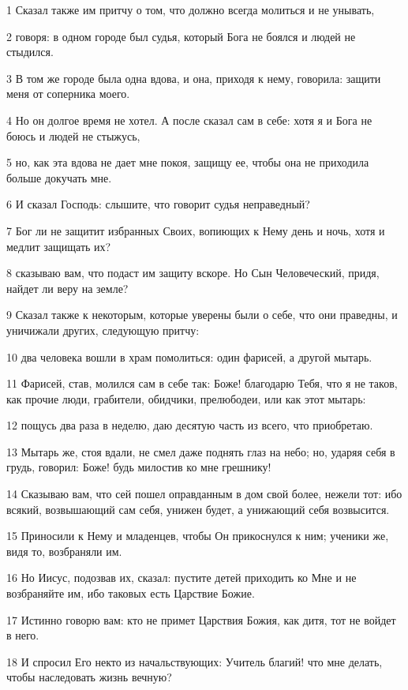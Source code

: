\par 1 Сказал также им притчу о том, что должно всегда молиться и не унывать,
\par 2 говоря: в одном городе был судья, который Бога не боялся и людей не стыдился.
\par 3 В том же городе была одна вдова, и она, приходя к нему, говорила: защити меня от соперника моего.
\par 4 Но он долгое время не хотел. А после сказал сам в себе: хотя я и Бога не боюсь и людей не стыжусь,
\par 5 но, как эта вдова не дает мне покоя, защищу ее, чтобы она не приходила больше докучать мне.
\par 6 И сказал Господь: слышите, что говорит судья неправедный?
\par 7 Бог ли не защитит избранных Своих, вопиющих к Нему день и ночь, хотя и медлит защищать их?
\par 8 сказываю вам, что подаст им защиту вскоре. Но Сын Человеческий, придя, найдет ли веру на земле?
\par 9 Сказал также к некоторым, которые уверены были о себе, что они праведны, и уничижали других, следующую притчу:
\par 10 два человека вошли в храм помолиться: один фарисей, а другой мытарь.
\par 11 Фарисей, став, молился сам в себе так: Боже! благодарю Тебя, что я не таков, как прочие люди, грабители, обидчики, прелюбодеи, или как этот мытарь:
\par 12 пощусь два раза в неделю, даю десятую часть из всего, что приобретаю.
\par 13 Мытарь же, стоя вдали, не смел даже поднять глаз на небо; но, ударяя себя в грудь, говорил: Боже! будь милостив ко мне грешнику!
\par 14 Сказываю вам, что сей пошел оправданным в дом свой более, нежели тот: ибо всякий, возвышающий сам себя, унижен будет, а унижающий себя возвысится.
\par 15 Приносили к Нему и младенцев, чтобы Он прикоснулся к ним; ученики же, видя то, возбраняли им.
\par 16 Но Иисус, подозвав их, сказал: пустите детей приходить ко Мне и не возбраняйте им, ибо таковых есть Царствие Божие.
\par 17 Истинно говорю вам: кто не примет Царствия Божия, как дитя, тот не войдет в него.
\par 18 И спросил Его некто из начальствующих: Учитель благий! что мне делать, чтобы наследовать жизнь вечную?
